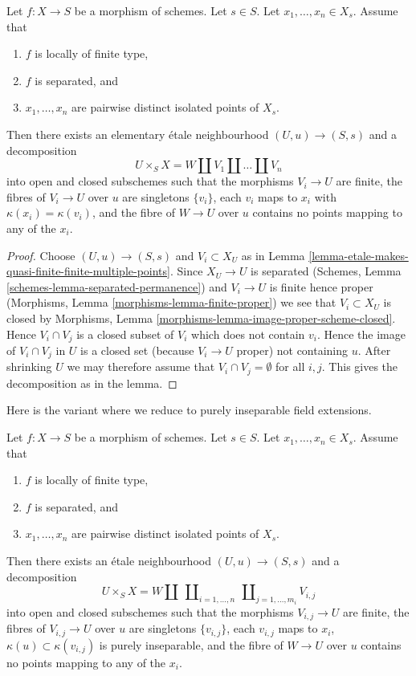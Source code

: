 \begin{lemma}
\label{lemma-etale-splits-off-quasi-finite-part-technical}
Let $f : X \to S$ be a morphism of schemes.
Let $s \in S$. Let $x_1, \ldots, x_n \in X_s$. Assume that
\begin{enumerate}
\item $f$ is locally of finite type,
\item $f$ is separated, and
\item $x_1, \ldots, x_n$ are pairwise distinct isolated points of $X_s$.
\end{enumerate}
Then there exists an elementary \'etale neighbourhood $(U, u) \to (S, s)$
and a decomposition
$$
U \times_S X = W \coprod V_1 \coprod \ldots \coprod V_n
$$
into open and closed subschemes such that the morphisms
$V_i \to U$ are finite, the fibres of $V_i \to U$ over $u$ are
singletons $\{v_i\}$, each $v_i$ maps to $x_i$ with
$\kappa(x_i) = \kappa(v_i)$, and the fibre of $W \to U$
over $u$ contains no points mapping to any of the $x_i$.
\end{lemma}

\begin{proof}
Choose $(U, u) \to (S, s)$ and $V_i \subset X_U$ as in
Lemma \ref{lemma-etale-makes-quasi-finite-finite-multiple-points}.
Since $X_U \to U$ is separated
(Schemes, Lemma \ref{schemes-lemma-separated-permanence})
and $V_i \to U$ is finite hence proper
(Morphisms, Lemma \ref{morphisms-lemma-finite-proper})
we see that $V_i \subset X_U$ is closed by
Morphisms, Lemma \ref{morphisms-lemma-image-proper-scheme-closed}.
Hence $V_i \cap V_j$ is a closed subset of $V_i$ which
does not contain $v_i$. Hence the image of $V_i \cap V_j$
in $U$ is a closed set (because $V_i \to U$ proper) not
containing $u$. After shrinking $U$ we may therefore assume
that $V_i \cap V_j = \emptyset$ for all $i, j$. This gives the
decomposition as in the lemma.
\end{proof}

\noindent
Here is the variant where we reduce to purely inseparable
field extensions.

\begin{lemma}
\label{lemma-etale-splits-off-quasi-finite-part-technical-variant}
Let $f : X \to S$ be a morphism of schemes.
Let $s \in S$. Let $x_1, \ldots, x_n \in X_s$. Assume that
\begin{enumerate}
\item $f$ is locally of finite type,
\item $f$ is separated, and
\item $x_1, \ldots, x_n$ are pairwise distinct isolated points of $X_s$.
\end{enumerate}
Then there exists an \'etale neighbourhood $(U, u) \to (S, s)$
and a decomposition
$$
U \times_S X =
W \coprod
\ \coprod\nolimits_{i = 1, \ldots, n}
\ \coprod\nolimits_{j = 1, \ldots, m_i}
V_{i, j}
$$
into open and closed subschemes such that the morphisms
$V_{i, j} \to U$ are finite, the fibres of $V_{i, j} \to U$ over $u$ are
singletons $\{v_{i, j}\}$, each $v_{i, j}$ maps to $x_i$,
$\kappa(u) \subset \kappa(v_{i, j})$ is purely inseparable,
and the fibre of $W \to U$ over $u$ contains no points mapping
to any of the $x_i$.
\end{lemma}

